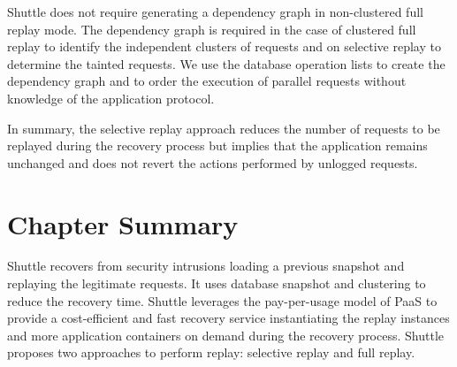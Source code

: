 



 Shuttle does not require generating a dependency graph in non-clustered full replay mode. The dependency graph is required in the case of clustered full replay to identify the independent clusters of requests and on selective replay to determine the tainted requests. We use the database operation lists to create the dependency graph and to order the execution of parallel requests without knowledge of the application protocol. 
 

 In summary, the selective replay approach reduces the number of requests to be replayed during the recovery process but implies that the application remains unchanged and does not revert the actions performed by unlogged requests. 


\section{Chapter Summary}
\label{sec:arch:summary}
Shuttle recovers from security intrusions loading a previous snapshot and replaying the legitimate requests. It uses database snapshot and clustering to reduce the recovery time. Shuttle leverages the pay-per-usage model of \ac{PaaS} to provide a cost-efficient and fast recovery service instantiating the replay instances and more application containers on demand during the recovery process. Shuttle proposes two approaches to perform replay: selective replay and full replay. 

